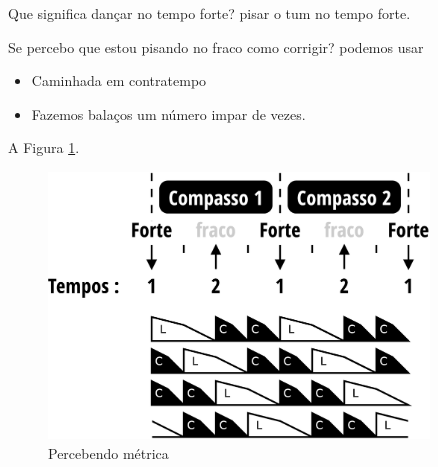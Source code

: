 Que significa dançar no tempo forte? 
pisar o tum  no tempo forte.

Se percebo que estou pisando no fraco como corrigir?
podemos usar
\begin{itemize}
\item Caminhada em contratempo
\item Fazemos balaços um número impar de vezes.
\end{itemize}


A Figura \ref{fig:tempovscontratempo}.

\begin{figure}[h]
    \centering 
\includegraphics[width=0.9\textwidth]{chapters/cap-musicalidade/bailarcontratempo.eps}
    \caption{Percebendo métrica}\label{fig:tempovscontratempo}
\end{figure}


